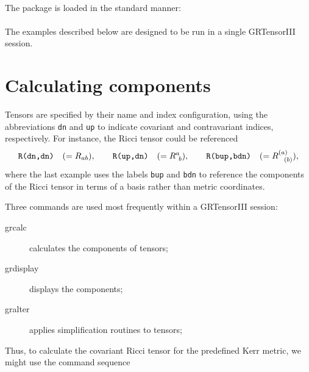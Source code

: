\documentclass{article}
\begin{document}
\noindent{}\\

The package is loaded in the standard manner:\\

\noindent{}\\

The examples described below are designed to be run in a single
GRTensorIII session.
\section{Calculating components}
Tensors are specified by their name and index configuration, using the
abbreviations {\tt dn} and {\tt up} to indicate covariant and
contravariant indices, respectively. For instance, the Ricci tensor
could be referenced
\[
  \text{\tt R(dn,dn)}\quad (= R_{ab}),\qquad
  \text{\tt R(up,dn)}\quad (= R^a_{\ b}), \qquad
  \text{\tt R(bup,bdn)}\quad (= R^{(a)}_{\ \ (b)}),
\]
where the last example uses the labels {\tt bup} and {\tt bdn} to
reference the components of the Ricci tensor in terms of a basis
rather than metric coordinates.

Three commands are used most frequently within a GRTensorIII session:
\begin{description}
  \item[grcalc] calculates the components of tensors;
  \item[grdisplay] displays the components;
  \item[gralter] applies simplification routines to tensors;
\end{description}
Thus, to calculate the covariant Ricci tensor for the predefined Kerr metric,
we might use the command sequence\\
\end{document}
